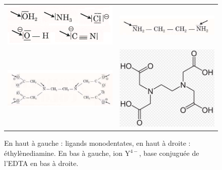 \documentclass[11pt,a4paper]{report}
\begin{document}
\begin{figure}[h!]
	\begin{center}
		\begin{tabular}{cc}
  		\includegraphics[scale = 0.4]{monodentate.png} &
   		\includegraphics[scale = 0.4]{ethylenediamine.png}\\
   		\includegraphics[scale = 0.5]{sel_edta.png} &
   		\includegraphics[scale = 0.4]{edta.png}\\
	\end{tabular}
	\caption{En haut à gauche : ligands monodentates, en haut à droite : éthylènediamine. En bas à 			gauche, ion $\text{Y}^{4-}$, base conjuguée de l'EDTA en bas à droite.}
	\end{center}
\end{figure}
\end{document}
